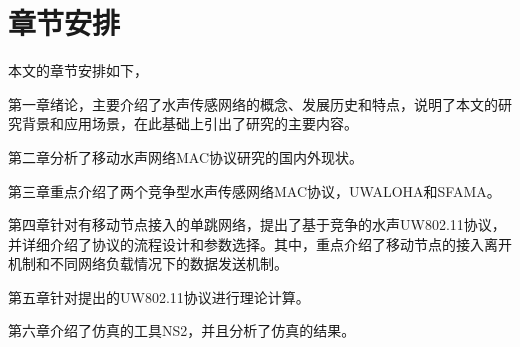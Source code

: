 \section{章节安排}
本文的章节安排如下，

第一章绪论，主要介绍了水声传感网络的概念、发展历史和特点，说明了本文的研究背景和应用场景，在此基础上引出了研究的主要内容。

第二章分析了移动水声网络MAC协议研究的国内外现状。

第三章重点介绍了两个竞争型水声传感网络MAC协议，UWALOHA和SFAMA。

第四章针对有移动节点接入的单跳网络，提出了基于竞争的水声UW802.11协议，并详细介绍了协议的流程设计和参数选择。其中，重点介绍了移动节点的接入离开机制和不同网络负载情况下的数据发送机制。

第五章针对提出的UW802.11协议进行理论计算。

第六章介绍了仿真的工具NS2，并且分析了仿真的结果。

\endinput